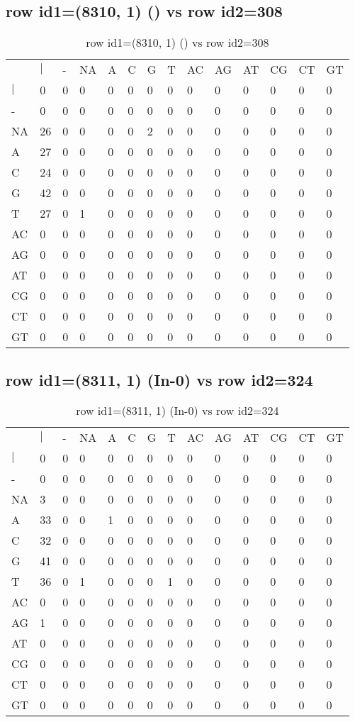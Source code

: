 \subsection{row id1=(8310, 1) () vs row id2=308}
\begin{center}
\begin{longtable}{|l|l|l|l|l|l|l|l|l|l|l|l|l|l|}
\caption{row id1=(8310, 1) () vs row id2=308} \label{table_dm490}\\
\hline
\\
\hline
&$|$&-&NA&A&C&G&T&AC&AG&AT&CG&CT&GT\\
$|$&0&0&0&0&0&0&0&0&0&0&0&0&0\\
-&0&0&0&0&0&0&0&0&0&0&0&0&0\\
NA&26&0&0&0&0&2&0&0&0&0&0&0&0\\
A&27&0&0&0&0&0&0&0&0&0&0&0&0\\
C&24&0&0&0&0&0&0&0&0&0&0&0&0\\
G&42&0&0&0&0&0&0&0&0&0&0&0&0\\
T&27&0&1&0&0&0&0&0&0&0&0&0&0\\
AC&0&0&0&0&0&0&0&0&0&0&0&0&0\\
AG&0&0&0&0&0&0&0&0&0&0&0&0&0\\
AT&0&0&0&0&0&0&0&0&0&0&0&0&0\\
CG&0&0&0&0&0&0&0&0&0&0&0&0&0\\
CT&0&0&0&0&0&0&0&0&0&0&0&0&0\\
GT&0&0&0&0&0&0&0&0&0&0&0&0&0\\
\hline
\end{longtable}
\end{center}

\subsection{row id1=(8311, 1) (In-0) vs row id2=324}
\begin{center}
\begin{longtable}{|l|l|l|l|l|l|l|l|l|l|l|l|l|l|}
\caption{row id1=(8311, 1) (In-0) vs row id2=324} \label{table_dm492}\\
\hline
\\
\hline
&$|$&-&NA&A&C&G&T&AC&AG&AT&CG&CT&GT\\
$|$&0&0&0&0&0&0&0&0&0&0&0&0&0\\
-&0&0&0&0&0&0&0&0&0&0&0&0&0\\
NA&3&0&0&0&0&0&0&0&0&0&0&0&0\\
A&33&0&0&1&0&0&0&0&0&0&0&0&0\\
C&32&0&0&0&0&0&0&0&0&0&0&0&0\\
G&41&0&0&0&0&0&0&0&0&0&0&0&0\\
T&36&0&1&0&0&0&1&0&0&0&0&0&0\\
AC&0&0&0&0&0&0&0&0&0&0&0&0&0\\
AG&1&0&0&0&0&0&0&0&0&0&0&0&0\\
AT&0&0&0&0&0&0&0&0&0&0&0&0&0\\
CG&0&0&0&0&0&0&0&0&0&0&0&0&0\\
CT&0&0&0&0&0&0&0&0&0&0&0&0&0\\
GT&0&0&0&0&0&0&0&0&0&0&0&0&0\\
\hline
\end{longtable}
\end{center}

